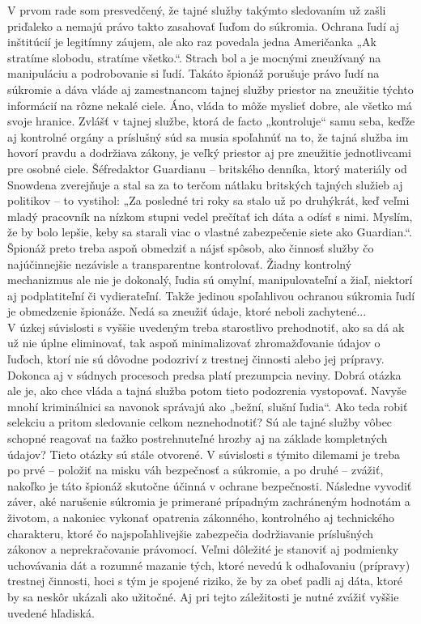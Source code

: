 \documentclass{article}
\begin{document}
\begin{flushleft}
\smallskip

V prvom rade som presvedčený, že tajné služby takýmto sledovaním už zašli priďaleko a nemajú právo takto zasahovať ľuďom do súkromia. Ochrana ľudí aj inštitúcií je legitímny záujem, ale ako raz povedala jedna Američanka „Ak stratíme slobodu, stratíme všetko.“. Strach bol a je mocnými zneužívaný na manipuláciu a podrobovanie si ľudí. Takáto špionáž porušuje právo ľudí na súkromie a dáva vláde aj zamestnancom tajnej služby priestor na zneužitie týchto informácií na rôzne nekalé ciele. Áno, vláda to môže myslieť dobre, ale všetko má svoje hranice. Zvlášť v tajnej službe, ktorá de facto „kontroluje“ samu seba, keďže aj kontrolné orgány a príslušný súd sa musia spoľahnúť na to, že tajná služba im hovorí pravdu a dodržiava zákony, je veľký priestor aj pre zneužitie jednotlivcami pre osobné ciele. Šéfredaktor Guardianu – britského denníka, ktorý materiály od Snowdena zverejňuje a stal sa za to terčom nátlaku britských tajných služieb aj politikov – to vystihol: „Za posledné tri roky sa stalo už po druhýkrát, keď veľmi mladý pracovník na nízkom stupni vedel prečítať ich dáta a odísť s nimi. Myslím, že by bolo lepšie, keby sa starali viac o vlastné zabezpečenie siete ako Guardian.“. Špionáž preto treba aspoň obmedziť a nájsť spôsob, ako činnosť služby čo najúčinnejšie nezávisle a transparentne kontrolovať. Žiadny kontrolný mechanizmus ale nie je dokonalý, ľudia sú omylní, manipulovateľní a žiaľ, niektorí aj podplatiteľní či vydierateľní. Takže jedinou spoľahlivou ochranou súkromia ľudí je obmedzenie špionáže. Nedá sa zneužiť údaje, ktoré neboli zachytené...\\
V úzkej súvislosti s vyššie uvedeným treba starostlivo prehodnotiť, ako sa dá ak už nie úplne eliminovať, tak aspoň minimalizovať zhromažďovanie údajov o ľuďoch, ktorí nie sú dôvodne podozriví z trestnej činnosti alebo jej prípravy. Dokonca aj v súdnych procesoch predsa platí prezumpcia neviny. Dobrá otázka ale je, ako chce vláda a tajná služba potom tieto podozrenia vystopovať. Navyše mnohí kriminálnici sa navonok správajú ako „bežní, slušní ľudia“. Ako teda robiť selekciu a pritom sledovanie celkom neznehodnotiť? Sú ale tajné služby vôbec schopné reagovať na ťažko postrehnuteľné hrozby aj na základe kompletných údajov? Tieto otázky sú stále otvorené. V súvislosti s týmito dilemami je treba po prvé – položiť na misku váh bezpečnosť a súkromie, a po druhé – zvážiť, nakoľko je táto špionáž skutočne účinná v ochrane bezpečnosti. Následne vyvodiť záver, aké narušenie súkromia je primerané prípadným zachráneným hodnotám a životom, a nakoniec vykonať opatrenia zákonného, kontrolného aj technického charakteru, ktoré čo najspoľahlivejšie zabezpečia dodržiavanie príslušných zákonov a neprekračovanie právomocí. Veľmi dôležité je stanoviť aj podmienky uchovávania dát a rozumné mazanie tých, ktoré nevedú k odhaľovaniu (prípravy) trestnej činnosti, hoci s tým je spojené riziko, že by za obeť padli aj dáta, ktoré by sa neskôr ukázali ako užitočné. Aj pri tejto záležitosti je nutné zvážiť vyššie uvedené hľadiská.\\

\end{flushleft}
\end{document}
